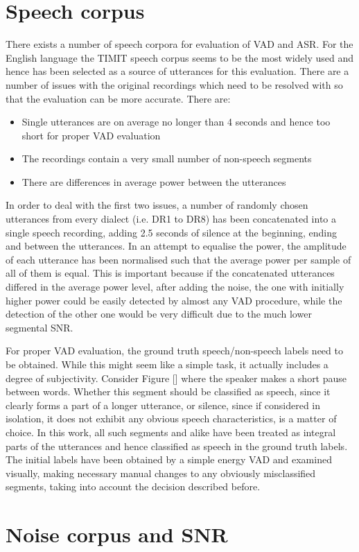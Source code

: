 
\section{Speech corpus}

There exists a number of speech corpora for evaluation of VAD and ASR. For the English language the TIMIT speech corpus \cite{TIMIT} seems to be the most widely used and hence has been selected as a source of utterances for this evaluation. There are a number of issues with the original recordings which need to be resolved with so that the evaluation can be more accurate. There are:

\begin{itemize}
\item Single utterances are on average no longer than 4 seconds and hence too short for proper VAD evaluation
\item The recordings contain a very small number of non-speech segments
\item There are differences in average power between the utterances
\end{itemize}

In order to deal with the first two issues, a number of randomly chosen utterances from every dialect (i.e. DR1 to DR8) has been concatenated into a single speech recording, adding 2.5 seconds of silence at the beginning, ending and between the utterances. In an attempt to equalise the power, the amplitude of each utterance has been normalised such that the average power per sample of all of them is equal. This is important because if the concatenated utterances differed in the average power level, after adding the noise, the one with initially higher power could be easily detected by almost any VAD procedure, while the detection of the other one would be very difficult due to the much lower segmental SNR.

For proper VAD evaluation, the ground truth speech/non-speech labels need to be obtained. While this might seem like a simple task, it actually includes a degree of subjectivity. Consider Figure [] where the speaker makes a short pause between words. Whether this segment should be classified as speech, since it clearly forms a part of a longer utterance, or silence, since if considered in isolation, it does not exhibit any obvious speech characteristics, is a matter of choice. In this work, all such segments and alike have been treated as integral parts of the utterances and hence classified as speech in the ground truth labels. The initial labels have been obtained by a simple energy VAD and examined visually, making necessary manual changes to any obviously misclassified segments, taking into account the decision described before.


\section{Noise corpus and SNR}
